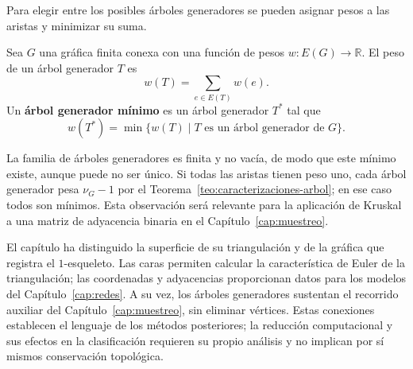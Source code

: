 Para elegir entre los posibles árboles generadores se pueden asignar pesos a las aristas y minimizar su suma.
\begin{definition}
\label{def:arbol-generador-minimo}
Sea $G$ una gráfica finita conexa con una función de pesos $w:E(G)\to\mathbb{R}$. El peso de un árbol generador $T$ es
\[
w(T)=\sum_{e\in E(T)}w(e).
\]
Un \textbf{árbol generador mínimo} es un árbol generador $T^\ast$ tal que
\[
w(T^\ast)=\min\{w(T)\mid T\text{ es un árbol generador de }G\}.
\]
\end{definition}

La familia de árboles generadores es finita y no vacía, de modo que este mínimo existe, aunque puede no ser único. Si todas las aristas tienen peso uno, cada árbol generador pesa $\nu_G-1$ por el Teorema~\ref{teo:caracterizaciones-arbol}; en ese caso todos son mínimos. Esta observación será relevante para la aplicación de Kruskal a una matriz de adyacencia binaria en el Capítulo~\ref{cap:muestreo}.

El capítulo ha distinguido la superficie de su triangulación y de la gráfica que registra el $1$-esqueleto. Las caras permiten calcular la característica de Euler de la triangulación; las coordenadas y adyacencias proporcionan datos para los modelos del Capítulo~\ref{cap:redes}. A su vez, los árboles generadores sustentan el recorrido auxiliar del Capítulo~\ref{cap:muestreo}, sin eliminar vértices. Estas conexiones establecen el lenguaje de los métodos posteriores; la reducción computacional y sus efectos en la clasificación requieren su propio análisis y no implican por sí mismos conservación topológica.
